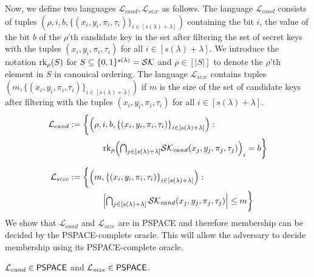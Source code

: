 Now, we define two languages $\mathcal L_{cand}, \mathcal L_{size}$ as follows.
The language $\mathcal L_{cand}$ consists of tuples $(\rho, i, b, \{(x_i, y_i, \pi_i, \tau_i)\}_{i \in [s(\lambda) + \lambda]})$
containing the bit $i$, the value of the bit $b$ of the $\rho$'th candidate key in the set after filtering the set of secret keys
with the tuples $(x_i, y_i, \pi_i, \tau_i)$ for all $i \in [s(\lambda) + \lambda]$. We introduce the notation $\rank{\rho}{S}$
for $S\subseteq \{0,1\}^{s(\lambda)} = \mathcal{SK}$ and $\rho \in [|S|]$ to denote the $\rho$'th element in $S$ in canonical ordering.
The language $\mathcal L_{size}$ contains tuples $(m, \{(x_i, y_i, \pi_i, \tau_i)\}_{i \in [s(\lambda) + \lambda]})$ if 
$m$ is the size of the set of candidate keys after filtering with the tuples $(x_i, y_i, \pi_i, \tau_i)$ for all $i \in [s(\lambda) + \lambda]$.
\begin{align}
	\mathcal L_{cand} &:= \biggl\{
		\Paren*{\rho, i, b, \Brace*{\Paren*{x_i, y_i, \pi_i, \tau_i}}_{i \in [s(\lambda) + \lambda]}} : \notag\\
		&\qquad\qquad \rank{\rho}{\textstyle{\bigcap_{j \in [s(\lambda) + \lambda]}} \SK_{cand}(x_j, y_j, \pi_j, \tau_j)}_i = b
	\biggr\}\\[6pt]
		\mathcal L_{size} &:= \biggl\{
			\Paren*{m, \Brace*{\Paren*{x_i, y_i, \pi_i, \tau_i}}_{i \in [s(\lambda) + \lambda]}} : \notag\\
			&\qquad\qquad \abs*{\textstyle \bigcap_{j \in [s(\lambda) + \lambda]} \SK_{cand}(x_j, y_j, \pi_j, \tau_j)} \le m
		\biggr\}
\end{align}
We show that $\mathcal L_{cand}$ and $\mathcal L_{size}$ are in PSPACE and therefore membership can be decided by 
the PSPACE-complete oracle. This will allow the adversary to decide membership 
using its PSPACE-complete oracle.

\begin{claim}\label{claim:lang_pspace}
	$\mathcal L_{cand} \in \textup{\textsf{PSPACE}}$ and $\mathcal L_{size} \in \textup{\textsf{PSPACE}}$.
\end{claim}


